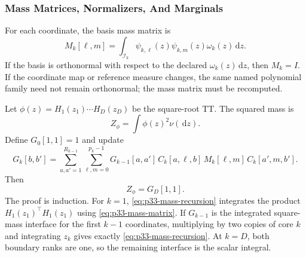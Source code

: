 \documentclass[11pt]{article}
\numberwithin{equation}{section}
\newcommand{\dd}{\,\mathrm d}
\begin{document}
\subsubsection{Mass Matrices, Normalizers, And Marginals}

For each coordinate, the basis mass matrix is
\begin{equation}
    M_k[\ell,m]
    =
    \int_{\mathcal I_k}
    \psi_{k,\ell}(z)\psi_{k,m}(z)\omega_k(z)\dd z.
    \label{eq:p33-mass-matrix}
\end{equation}
If the basis is orthonormal with respect to the declared
\(\omega_k(z)\dd z\), then \(M_k=I\).  If the coordinate map or reference
measure changes, the same named polynomial family need not remain
orthonormal; the mass matrix must be recomputed.

Let \(\phi(z)=H_1(z_1)\cdots H_D(z_D)\) be the square-root TT.  The squared
mass is
\begin{equation}
    Z_\phi
    =
    \int \phi(z)^2\nu(\dd z).
    \label{eq:p33-square-mass}
\end{equation}
Define \(G_0[1,1]=1\) and update
\begin{equation}
    G_k[b,b']
    =
    \sum_{a,a'=1}^{R_{k-1}}
    \sum_{\ell,m=0}^{p_k-1}
    G_{k-1}[a,a']\,
    C_k[a,\ell,b]\,
    M_k[\ell,m]\,
    C_k[a',m,b'].
    \label{eq:p33-mass-recursion}
\end{equation}
Then
\begin{equation}
    Z_\phi=G_D[1,1].
    \label{eq:p33-mass-final}
\end{equation}
The proof is induction.  For \(k=1\), \eqref{eq:p33-mass-recursion}
integrates the product \(H_1(z_1)^\top H_1(z_1)\) using
\eqref{eq:p33-mass-matrix}.  If \(G_{k-1}\) is the integrated square-mass
interface for the first \(k-1\) coordinates, multiplying by two copies of
core \(k\) and integrating \(z_k\) gives exactly \eqref{eq:p33-mass-recursion}.
At \(k=D\), both boundary ranks are one, so the remaining interface is the
scalar integral.
\end{document}
